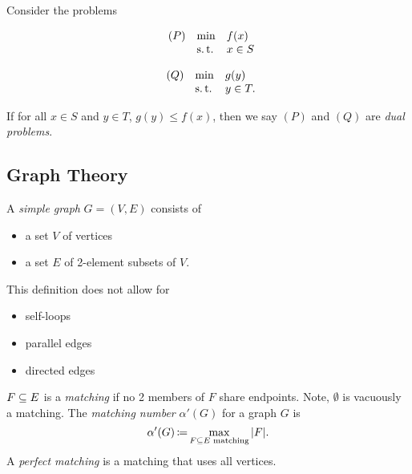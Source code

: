 \begin{defn}
    \label{def:dual-problems}
    Consider the problems
    \begin{multicols}{2}
        \noindent
        \begin{equation*}
        \begin{array}{lll@{}}
            (P)     & \min  &  f(x)     \\
                    & \st   &   x \in S \\
        \end{array}
        \end{equation*}
        
        \noindent
        \begin{equation*}
        \begin{array}{lll@{}}
            (Q)     & \min  &  g(y)     \\
                    & \st   &   y \in T. \\
        \end{array}
        \end{equation*}
    \end{multicols}
    If for all $x \in S$ and $y \in T$, $g(y) \le f(x)$, then we say $(P)$ and $(Q)$ are \textit{dual problems}.
\end{defn}


\subsection{Graph Theory}
\label{subsec:graph-theory}

\begin{defn}
    \label{def:simple-graph}
    A \textit{simple graph} $G = (V, E)$ consists of 
    \begin{itemize}
        \item a set $V$ of vertices
        \item a set $E$ of 2-element subsets of $V$.
    \end{itemize}
    This definition does not allow for
    \begin{itemize}
        \item self-loops
        \item parallel edges
        \item directed edges
    \end{itemize}
\end{defn}

\begin{defn}[Matching]
    \label{def:matching}
    $F \subseteq E$ is a \textit{matching} if no 2 members of $F$ share endpoints. Note, $\emptyset$ is vacuously a matching. The \textit{matching number} $\alpha'(G)$ for a graph $G$ is
    \[
        \alpha'(G) \operatorname*{\coloneqq} \max_{F \subseteq E \text{ matching}} |F|.
    \]
    A \textit{perfect matching} is a matching that uses all vertices.
\end{defn}

